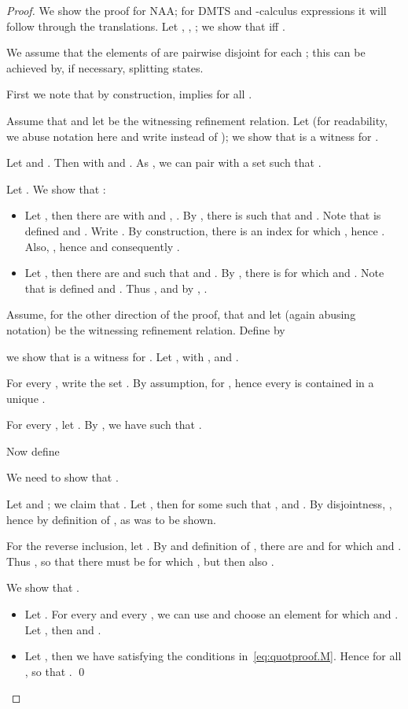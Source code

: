 \documentclass[twocolumn]{svjour3-dummy}
\newcommand*\NAA{NAA\xspace}
\begin{document}
\begin{proof}We show the proof for \NAA; for DMTS and -calculus expressions it
  will follow through the translations.  Let , , ; we show that  iff .

  We assume that the elements of  are pairwise disjoint
  for each ; this can be achieved by, if necessary,
  splitting states.

  First we note that by construction,  implies 
  for all .

  Assume that  and let  be the witnessing refinement relation.
  Let  (for
  readability, we abuse notation here and write 
  instead of ); we show that  is a witness for
  .

  Let  and .  Then
   with  and .  As , we can pair  with a set  such that .

  Let .  We show that :
  \begin{itemize}
  \item Let , then there are  with  and , .  By , there is  such that  and .  Note that
     is defined and .  Write .  By construction, there
    is an index  for which , hence .  Also, , hence  and consequently .
  \item Let , then there are 
    and  such that  and
    .  By , there is  for which  and .  Note
    that  is defined and .  Thus , and by , .
  \end{itemize}

  Assume, for the other direction of the proof, that  and let  (again
  abusing notation) be the witnessing refinement relation.  Define
   by
  
  we show that  is a witness for .  Let , with ,
  and .

  For every , write the set .  By assumption,  for , hence every  is contained in a unique .

  For every , let .  By , we have  such that .

  Now define
  
  We need to show that .

  Let  and ; we
  claim that .
  Let , then  for some  such that ,  and .  By disjointness,
  , hence by definition of ,  as was to be shown.

  For the reverse inclusion, let .  By
   and definition of ,
  there are  and  for
  which  and .  Thus , so that there must be  for
  which , but then also .

  We show that .
  \begin{itemize}
  \item Let .  For every  and
    every , we can use  and choose an element  for
    which  and .
    Let , then  and .
  \item Let , then we have 
    satisfying the conditions in~\eqref{eq:quotproof.M}.  Hence  for all , so that . \qed
  \end{itemize}
\end{proof}
\end{document}
